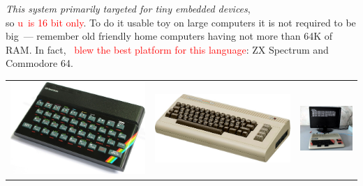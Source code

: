 \clearpage{}\label{deskboard}

\emph{This system primarily targeted for tiny embedded devices},\\
so \textcolor{red}{u\F\ is 16 bit only}. To do it usable toy on large
computers it is not
required to be big\ --- remember old friendly home computers having not more
than 64K of RAM. In fact, \textcolor{red}{\F\ blew the best platform for
this language}: ZX Spectrum and Commodore 64.

\smallskip\noindent
\begin{tabular}{l l l}
\includegraphics[height=0.35\textheight]{img/ZX48.jpg} &
\includegraphics[height=0.35\textheight]{img/C64.jpg} &
\includegraphics[height=0.35\textheight]{img/microsha.jpg} \\
\end{tabular}
\clearpage

